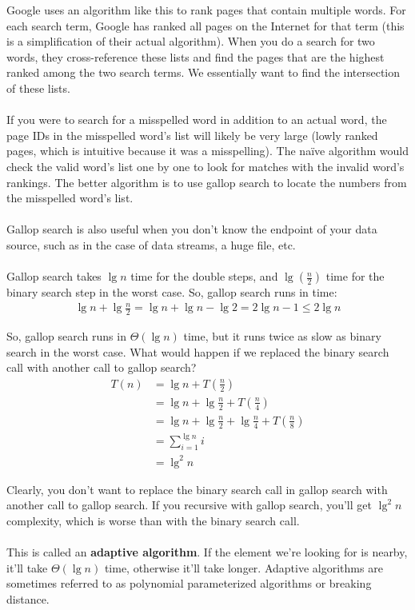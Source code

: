 \documentclass[]{article}
\theoremstyle{definition}
\begin{document}
			Google uses an algorithm like this to rank pages that contain multiple words. For each search term, Google has ranked all pages on the Internet for that term (this is a simplification of their actual algorithm). When you do a search for two words, they cross-reference these lists and find the pages that are the highest ranked among the two search terms. We essentially want to find the intersection of these lists.
			\\ \\
			If you were to search for a misspelled word in addition to an actual word, the page IDs in the misspelled word's list will likely be very large (lowly ranked pages, which is intuitive because it was a misspelling). The na\"ive algorithm would check the valid word's list one by one to look for matches with the invalid word's rankings. The better algorithm is to use gallop search to locate the numbers from the misspelled word's list.
			\\ \\
			Gallop search is also useful when you don't know the endpoint of your data source, such as in the case of data streams, a huge file, etc.
			\\ \\
			Gallop search takes $\lg n$ time for the double steps, and $\lg \left( \frac{n}{2} \right)$ time for the binary search step in the worst case. So, gallop search runs in time:
			\begin{align*}
				\lg n + \lg \frac{n}{2} = \lg n + \lg n - \lg 2 = 2 \lg n - 1 \le 2 \lg n
			\end{align*}

			So, gallop search runs in $\Theta(\lg n)$ time, but it runs twice as slow as binary search in the worst case. What would happen if we replaced the binary search call with another call to gallop search?
			\begin{align*}
				T(n) &= \lg n + T \left( \frac{n}{2} \right) \\
				&= \lg n + \lg \frac{n}{2} + T \left( \frac{n}{4} \right) \\
				&= \lg n + \lg \frac{n}{2} + \lg \frac{n}{4} + T \left( \frac{n}{8} \right) \\
				&= \sum_{i = 1}^{\lg n} i \\
				&= \lg^2 n
			\end{align*}

			Clearly, you don't want to replace the binary search call in gallop search with another call to gallop search. If you recursive with gallop search, you'll get $\lg^2 n$ complexity, which is worse than with the binary search call.
			\\ \\
			This is called an \textbf{adaptive algorithm}. If the element we're looking for is nearby, it'll take $\Theta(\lg n)$ time, otherwise it'll take longer. Adaptive algorithms are sometimes referred to as polynomial parameterized algorithms or breaking distance.
\end{document}
